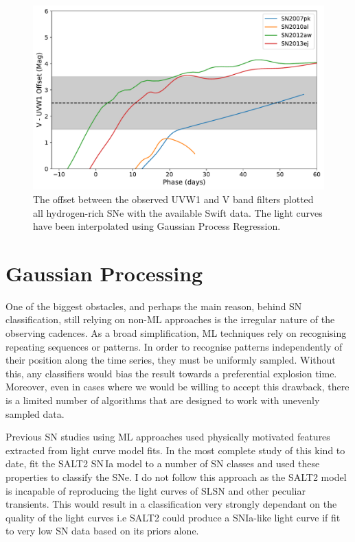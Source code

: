 \begin{figure}
  \centering
  \includegraphics[width=\textwidth]{Figures/Chapter3/VOffset_II}
  \caption{The offset between the observed UVW1 and V band filters plotted all hydrogen-rich SNe with the available Swift data. The light curves have been interpolated using Gaussian Process Regression.}
  \label{fig:SNIIbbExtension}
\end{figure}

\section{Gaussian Processing} \label{sec:GP}
One of the biggest obstacles, and perhaps the main reason, behind SN classification, still relying on non-ML approaches is the irregular nature of the observing cadences. As a broad simplification, ML techniques rely on recognising repeating sequences or patterns. In order to recognise patterns independently of their position along the time series, they must be uniformly sampled. Without this, any classifiers would bias the result towards a preferential explosion time. Moreover, even in cases where we would be willing to accept this drawback, there is a limited number of algorithms that are designed to work with unevenly sampled data.

Previous SN studies using ML approaches used physically motivated features extracted from light curve model fits. In the most complete study of this kind to date, \citet{Lochner2016} fit the SALT2 SN\,Ia model to a number of SN classes and used these properties to classify the SNe. I do not follow this approach as the SALT2 model is incapable of reproducing the light curves of SLSN and other peculiar transients. This would result in a classification very strongly dependant on the quality of the light curves i.e SALT2 could produce a SNIa-like light curve if fit to very low S\/N data based on its priors alone.

